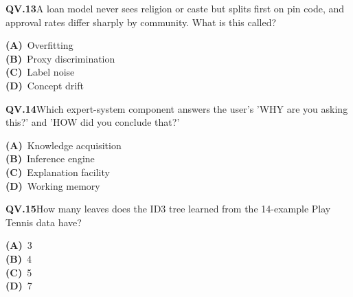 \documentclass[11pt]{article}
\begin{document}
\begin{tcolorbox}[enhanced,breakable,colback=white,colframe=navyL,arc=2mm,boxrule=0.7pt,left=3mm,right=3mm,top=2mm,bottom=2mm]
\textbf{\color{navy}QV.13}\quad A loan model never sees religion or caste but splits first on pin code, and approval rates differ sharply by community. What is this called?\hfill{}\par\smallskip
{\small \textbf{\color{navyL}(A)}\ Overfitting\\[1pt]\textbf{\color{navyL}(B)}\ Proxy discrimination\\[1pt]\textbf{\color{navyL}(C)}\ Label noise\\[1pt]\textbf{\color{navyL}(D)}\ Concept drift}
\end{tcolorbox}
\begin{tcolorbox}[enhanced,breakable,colback=white,colframe=navyL,arc=2mm,boxrule=0.7pt,left=3mm,right=3mm,top=2mm,bottom=2mm]
\textbf{\color{navy}QV.14}\quad Which expert-system component answers the user's 'WHY are you asking this?' and 'HOW did you conclude that?'\hfill{}\par\smallskip
{\small \textbf{\color{navyL}(A)}\ Knowledge acquisition\\[1pt]\textbf{\color{navyL}(B)}\ Inference engine\\[1pt]\textbf{\color{navyL}(C)}\ Explanation facility\\[1pt]\textbf{\color{navyL}(D)}\ Working memory}
\end{tcolorbox}
\begin{tcolorbox}[enhanced,breakable,colback=white,colframe=navyL,arc=2mm,boxrule=0.7pt,left=3mm,right=3mm,top=2mm,bottom=2mm]
\textbf{\color{navy}QV.15}\quad How many leaves does the ID3 tree learned from the 14-example Play Tennis data have?\hfill{}\par\smallskip
{\small \textbf{\color{navyL}(A)}\ 3\\[1pt]\textbf{\color{navyL}(B)}\ 4\\[1pt]\textbf{\color{navyL}(C)}\ 5\\[1pt]\textbf{\color{navyL}(D)}\ 7}
\end{tcolorbox}
\newpage
\end{document}
